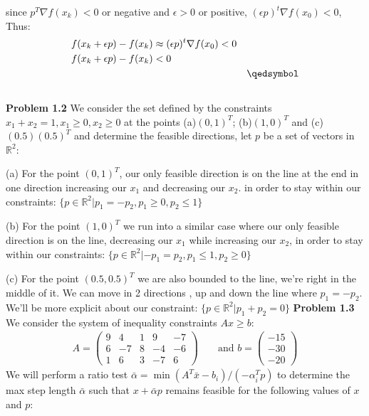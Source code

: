 \documentclass{article}
\begin{document}
since $ p^T \nabla f(x_k) < 0$ or negative and $\epsilon > 0$ or positive, $(\epsilon p)^t \nabla f(x_0) < 0$, Thus:
\begin{align*}
    f(x_k + \epsilon p) - f(x_k) & \approx (\epsilon p)^t \nabla f(x_0) < 0 \\
    f(x_k + \epsilon p) - f(x_k) & < 0 \\
    \null && \qedsymbol
\end{align*} \\ 
\textbf{Problem 1.2} We consider the set defined by the constraints $x_1 + x_2 = 1, x_1 \geq 0, x_2 \geq 0 $ at the points (a)$(0,1)^T$; (b)$(1,0)^T$ and (c)$(0.5)(0.5)^T$ and determine the feasible directions, let $p$ be a set of vectors in $\mathbb{R}^2$:

\noindent(a) For the point $(0,1)^T$, our only feasible direction is on the line at the end in one direction increasing our $x_1$ and decreasing our $x_2$. in order to stay within our constraints: \newline $\{p \in \mathbb{R}^2 | p_1 = -p_2, p_1 \geq 0, p_2 \leq 1\}$ 

\noindent(b) For the point $(1,0)^T$ we run into a similar case where our only feasible direction is on the line, decreasing our $x_1$ while increasing our $x_2$, in order to stay within our constraints: \newline $\{p \in \mathbb{R}^2 | -p_1 = p_2, p_1 \leq 1, p_2 \geq 0\}$

\noindent(c) For the point $(0.5,0.5)^T$ we are also bounded to the line, we're right in the middle of it. We can move in 2 directions , up and down the line where $p_1 = -p_2$. We'll be more explicit about our constraint: $\{p \in \mathbb{R}^2 | p_1 + p_2 = 0\}$
\newline
\newline
\textbf{Problem 1.3} We consider the system of inequality constraints $Ax \geq b$:
\begin{align*}
    A =
    \begin{pmatrix}
        9 & 4 & 1 & 9 & -7 \\
        6 & -7 & 8 & -4 & -6 \\ 
        1 & 6 & 3 & -7 & 6
    \end{pmatrix} && 
    \text{ and }
    b =
    \begin{pmatrix}
        -15 \\ -30 \\ -20
    \end{pmatrix}
\end{align*} We will perform a ratio test $\bar{\alpha} = \min(A^T\bar{x} - b_i) / (-\alpha_i^T p)$ to determine the max step length $\bar{\alpha}$ such that $x + \bar{\alpha} p$ remains feasible for the following values of $x$ and $p$:
\end{document}
